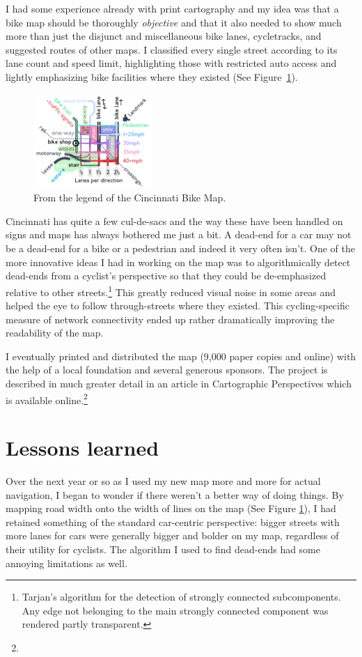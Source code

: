 \documentclass{article}
\begin{document}
		I had some experience already with print cartography and my idea was that a bike map should be thoroughly \textit{objective} and that it also needed to show much more than just the disjunct and miscellaneous bike lanes, cycletracks, and suggested routes of other maps. I classified every single street according to its lane count and speed limit, highlighting those with restricted auto access and lightly emphasizing bike facilities where they existed (See Figure~\ref{fig:legend}). 
		
		\begin{figure}[h!]
			\centering
			\includegraphics[width=0.4\textwidth]{legend}
			\caption{From the legend of the Cincinnati Bike Map.}
			\label{fig:legend}
		\end{figure}
		
		Cincinnati has quite a few cul-de-sacs and the way these have been handled on signs and maps has always bothered me just a bit. A dead-end for a car may not be a dead-end for a bike or a pedestrian and indeed it very often isn't.
		One of the more innovative ideas I had in working on the map was to algorithmically detect dead-ends from a cyclist's perspective so that they could be de-emphasized relative to other streets.\footnote{
			Tarjan's algorithm for the detection of strongly connected subcomponents. Any edge not belonging to the main strongly connected component was rendered partly transparent.
		} This greatly reduced visual noise in some areas and helped the eye to follow through-streets where they existed.
		This cycling-specific measure of network connectivity ended up rather dramatically improving the readability of the map. 
		
		I eventually printed and distributed the map (9,000 paper copies and online) with the help of a local foundation and several generous sponsors. The project is described in much greater detail in an article in Cartographic Perspectives which is available online.\footnote{}
	
	\section*{Lessons learned}
		Over the next year or so as I used my new map more and more for actual navigation, I began to wonder if there weren't a better way of doing things. By mapping road width onto the width of lines on the map (See Figure \ref{fig:legend}), I had retained something of the standard car-centric perspective: bigger streets with more lanes for cars were generally bigger and bolder on my map, regardless of their utility for cyclists. The algorithm I used to find dead-ends had some annoying limitations as well.
		
\end{document}
